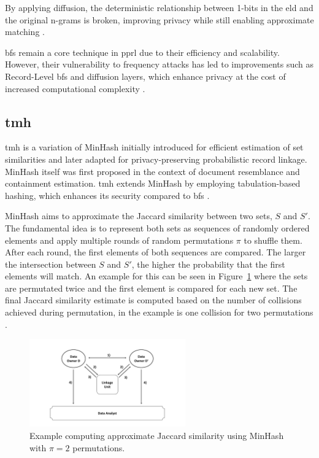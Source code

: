 By applying diffusion, the deterministic relationship between 1-bits in the \ac{eld} and the original n-grams is broken, improving privacy while still enabling approximate matching \cite{armknecht2023strengthening}.

\ac{bf}s remain a core technique in \ac{pprl} due to their efficiency and scalability.
However, their vulnerability to frequency attacks has led to improvements such as Record-Level \ac{bf}s and diffusion layers, which enhance privacy at the cost of increased computational complexity \cite{schaefer2024, vidanage2020graph,armknecht2023strengthening}.


\subsection{\ac{tmh}} \label{sec:tmh}

\ac{tmh} is a variation of MinHash initially introduced for efficient estimation of set similarities and later adapted for privacy-preserving probabilistic record linkage.
MinHash itself was first proposed in the context of document resemblance and containment estimation.
\ac{tmh} extends MinHash by employing tabulation-based hashing, which enhances its security compared to \ac{bf}s \cite{vidanage2020graph,broder1997resemblance}.

MinHash aims to approximate the Jaccard similarity between two sets, \(S\) and \(S'\).
The fundamental idea is to represent both sets as sequences of randomly ordered elements and apply multiple rounds of random permutations \(\pi\) to shuffle them.
After each round, the first elements of both sequences are compared.
The larger the intersection between \(S\) and \(S'\), the higher the probability that the first elements will match.
An example for this can be seen in Figure~\ref{fig:minhashexample} where the sets are permutated twice and the first element is compared for each new set.
The final Jaccard similarity estimate is computed based on the number of collisions achieved during permutation, in the example is one collision for two permutations \cite{schaefer2024,broder1997resemblance,vidanage2020graph}.

\begin{figure}[H]
  \centering
  \includegraphics[width=0.6\textwidth, page=6]{img/visualization.pdf}
  \caption{Example computing approximate Jaccard similarity using MinHash with \(\pi = 2\) permutations.}
  \label{fig:minhashexample}
\end{figure}

